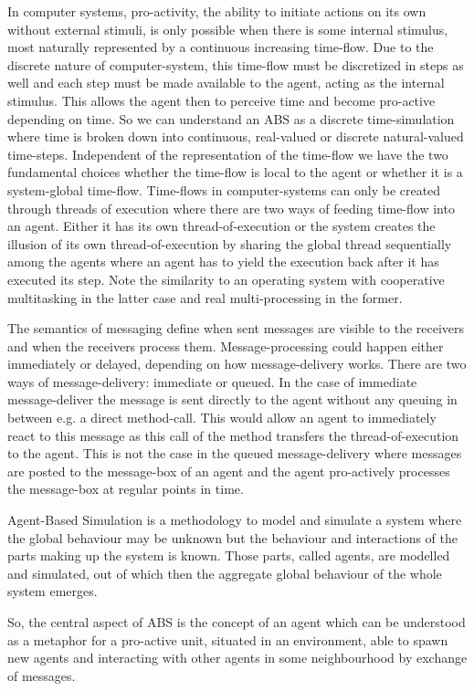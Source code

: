 In computer systems, pro-activity, the ability to initiate actions on its own without external stimuli, is only possible when there is some internal stimulus, most naturally represented by a continuous increasing time-flow. Due to the discrete nature of computer-system, this time-flow must be discretized in steps as well and each step must be made available to the agent, acting as the internal stimulus. This allows the agent then to perceive time and become pro-active depending on time. So we can understand an ABS as a discrete time-simulation where time is broken down into continuous, real-valued or discrete natural-valued time-steps. Independent of the representation of the time-flow we have the two fundamental choices whether the time-flow is local to the agent or whether it is a system-global time-flow. Time-flows in computer-systems can only be created through threads of execution where there are two ways of feeding time-flow into an agent. Either it has its own thread-of-execution or the system creates the illusion of its own thread-of-execution by sharing the global thread sequentially among the agents where an agent has to yield the execution back after it has executed its step. Note the similarity to an operating system with cooperative multitasking in the latter case and real multi-processing in the former.

The semantics of messaging define when sent messages are visible to the receivers and when the receivers process them. Message-processing could happen either immediately or delayed, depending on how message-delivery works. There are two ways of message-delivery: immediate or queued. In the case of immediate message-deliver the message is sent directly to the agent without any queuing in between e.g. a direct method-call. This would allow an agent to immediately react to this message as this call of the method transfers the thread-of-execution to the agent. This is not the case in the queued message-delivery where messages are posted to the message-box of an agent and the agent pro-actively processes the message-box at regular points in time.

Agent-Based Simulation is a methodology to model and simulate a system where the global behaviour may be unknown but the behaviour and interactions of the parts making up the system is known. Those parts, called agents, are modelled and simulated, out of which then the aggregate global behaviour of the whole system emerges.

So, the central aspect of ABS is the concept of an agent which can be understood as a metaphor for a pro-active unit, situated in an environment, able to spawn new agents and interacting with other agents in some neighbourhood by exchange of messages. 

